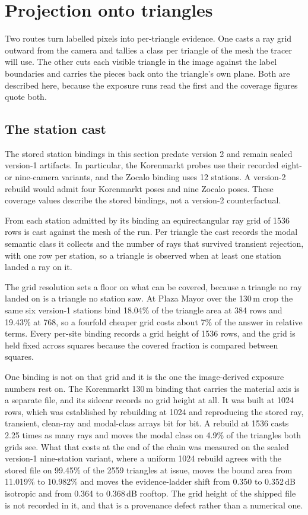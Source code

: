 \documentclass[journal]{IEEEtran}
\begin{document}
\section{Projection onto triangles}
\label{sec:si-projection}

Two routes turn labelled pixels into per-triangle evidence. One casts a ray grid
outward from the camera and tallies a class per triangle of the mesh the tracer
will use. The other cuts each visible triangle in the image against the label
boundaries and carries the pieces back onto the triangle's own plane. Both are
described here, because the exposure runs read the first and the coverage
figures quote both.

\subsection{The station cast}

The stored station bindings in this section predate version 2 and remain sealed
version-1 artifacts. In particular, the Korenmarkt probes use their recorded
eight- or nine-camera variants, and the Zocalo binding uses 12 stations. A
version-2 rebuild would admit four Korenmarkt poses and nine Zocalo poses. These
coverage values describe the stored bindings, not a version-2 counterfactual.

From each station admitted by its binding an equirectangular ray grid of 1536 rows is cast
against the mesh of the run. Per triangle the cast records the modal semantic
class it collects and the number of rays that survived transient rejection, with
one row per station, so a triangle is observed when at least one station landed
a ray on it.

The grid resolution sets a floor on what can be covered, because a triangle no
ray landed on is a triangle no station saw. At Plaza Mayor over the 130\,m crop
the same six version-1 stations bind 18.04\% of the triangle area at 384 rows and
19.43\% at 768, so a fourfold cheaper grid costs about 7\% of the answer in
relative terms. Every per-site binding records a grid height of 1536 rows, and
the grid is held fixed across squares because the covered fraction is compared
between squares.

One binding is not on that grid and it is the one the image-derived exposure
numbers rest on. The Korenmarkt 130\,m binding that carries the material axis is
a separate file, and its sidecar records no grid height at all. It was built at
1024 rows, which was established by rebuilding at 1024 and reproducing the
stored ray, transient, clean-ray and modal-class arrays bit for bit. A rebuild
at 1536 casts 2.25 times as many rays and moves the modal class on 4.9\% of the
triangles both grids see. What that costs at the end of the chain was measured
on the sealed version-1 nine-station variant, where a uniform 1024 rebuild agrees with the stored
file on 99.45\% of the 2559 triangles at issue, moves the bound area from
11.019\% to 10.982\% and moves the evidence-ladder shift from 0.350 to
0.352\,dB isotropic and from 0.364 to 0.368\,dB rooftop. The grid height of the
shipped file is not recorded in it, and that is a provenance defect rather than
a numerical one.
\end{document}
